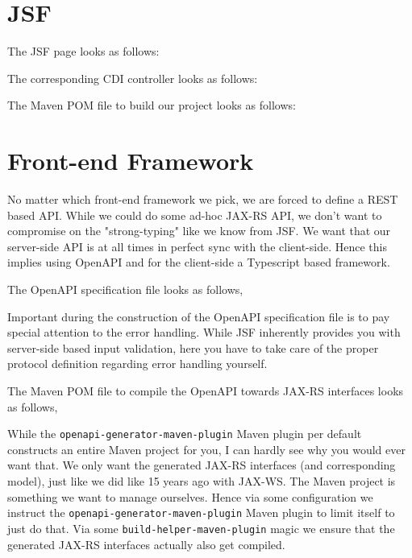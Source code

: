 \section{JSF}
The JSF page looks as follows:

The corresponding CDI controller looks as follows:

The Maven POM file to build our project looks as follows:


\section{Front-end Framework}
No matter which front-end framework we pick, we are forced to define a REST based API.
While we could do some ad-hoc JAX-RS API, we don't want to compromise on the "strong-typing" like we know from JSF.
We want that our server-side API is at all times in perfect sync with the client-side.
Hence this implies using OpenAPI and for the client-side a Typescript based framework.

The OpenAPI specification file looks as follows,

Important during the construction of the OpenAPI specification file is to pay special attention to the error handling.
While JSF inherently provides you with server-side based input validation, here you have to take care of the proper protocol definition regarding error handling yourself.

The Maven POM file to compile the OpenAPI towards JAX-RS interfaces looks as follows,

While the \texttt{openapi-generator-maven-plugin} Maven plugin per default constructs an entire Maven project for you, I can hardly see why you would ever want that.
We only want the generated JAX-RS interfaces (and corresponding model), just like we did like 15 years ago with JAX-WS.
The Maven project is something we want to manage ourselves.
Hence via some configuration we instruct the \texttt{openapi-generator-maven-plugin} Maven plugin to limit itself to just do that.
Via some \texttt{build-helper-\allowbreak maven-plugin} magic we ensure that the generated JAX-RS interfaces actually also get compiled.

